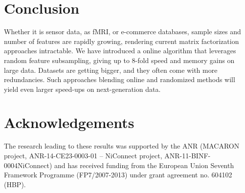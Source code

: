 \documentclass{article}
\begin{document}
\section{Conclusion}

Whether it is sensor data, as fMRI, or e-commerce databases, sample sizes and
number of features are rapidly growing, rendering current matrix
factorization approaches  intractable. We have introduced a online algorithm that leverages
random feature subsampling, giving up to 8-fold speed and memory gains on
large data. Datasets are getting bigger,
and they often come with more redundancies. Such approaches
blending online and randomized methods will yield even larger
speed-ups on next-generation data.

\section*{Acknowledgements} The research leading to these results was
supported by the ANR (MACARON project, ANR-14-CE23-0003-01 -- NiConnect
project, ANR-11-BINF-0004NiConnect) and has received funding from the
European Union Seventh Framework Programme (FP7/2007-2013) under grant
agreement no. 604102 (HBP).



\end{document}
